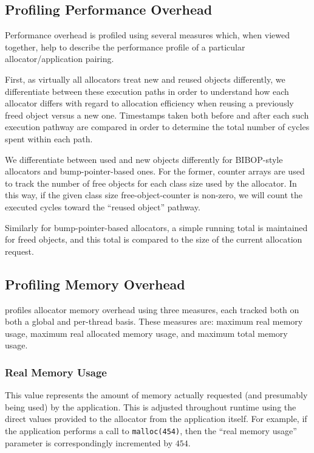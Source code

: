 \subsection{Profiling Performance Overhead}

\label{sec:performanceimplement}

Performance overhead is profiled using several measures which, when viewed together, help to describe the performance profile of a particular allocator/application pairing.

First, as virtually all allocators treat new and reused objects differently, we differentiate between these execution paths in order to understand how each allocator differs with regard to allocation efficiency when reusing a previously freed object versus a new one. Timestamps taken both before and after each such execution pathway are compared in order to determine the total number of cycles spent within each path.

We differentiate between used and new objects differently for BIBOP-style allocators and bump-pointer-based ones. For the former, counter arrays are used to track the number of free objects for each class size used by the allocator. In this way, if the given class size free-object-counter is non-zero, we will count the executed cycles toward the ``reused object'' pathway.

Similarly for bump-pointer-based allocators, a simple running total is maintained for freed objects, and this total is compared to the size of the current allocation request.


\subsection{Profiling Memory Overhead}
\MP{} profiles allocator memory overhead using three measures, each tracked both on both a global and per-thread basis. These measures are: maximum real memory usage, maximum real allocated memory usage, and maximum total memory usage.

\subsubsection{Real Memory Usage}
This value represents the amount of memory actually requested (and presumably being used) by the application. This is adjusted throughout runtime using the direct values provided to the allocator from the application itself. For example, if the application performs a call to \texttt{malloc(454)}, then the ``real memory usage'' parameter is correspondingly incremented by $454$.

